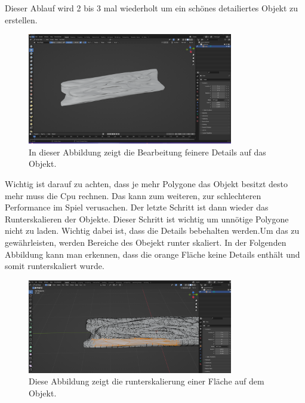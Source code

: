 \noindent Dieser Ablauf wird 2 bis 3 mal wiederholt um ein schönes detailiertes Objekt zu erstellen.
\begin{figure}[H]
    \centering
    \includegraphics[width=0.8\textwidth]{chapters/13/images/HolzBrett2.png}
    \caption{In dieser Abbildung zeigt die Bearbeitung feinere Details auf das Objekt.}
    \label{UST-16}
\end{figure}
\noindent Wichtig ist darauf zu achten, dass je mehr Polygone das Objekt besitzt desto mehr muss die Cpu rechnen. Das kann zum weiteren, zur schlechteren Performance im Spiel verusachen. Der letzte Schritt ist dann wieder das Runterskalieren der Objekte. Dieser Schritt ist wichtig um unnötige Polygone nicht zu laden. Wichtig dabei ist, dass die Details bebehalten werden.Um das zu gewährleisten, werden Bereiche des Obejekt runter skaliert. In der Folgenden Abbildung kann man erkennen, dass die orange Fläche keine Details enthält und somit runterskaliert wurde.

\begin{figure}[H]
    \centering
    \includegraphics[width=0.8\textwidth]{chapters/13/images/HolzBrett3.png}
    \caption{Diese Abbildung zeigt die runterskalierung einer Fläche auf dem Objekt.}
    \label{UST-17}
\end{figure}